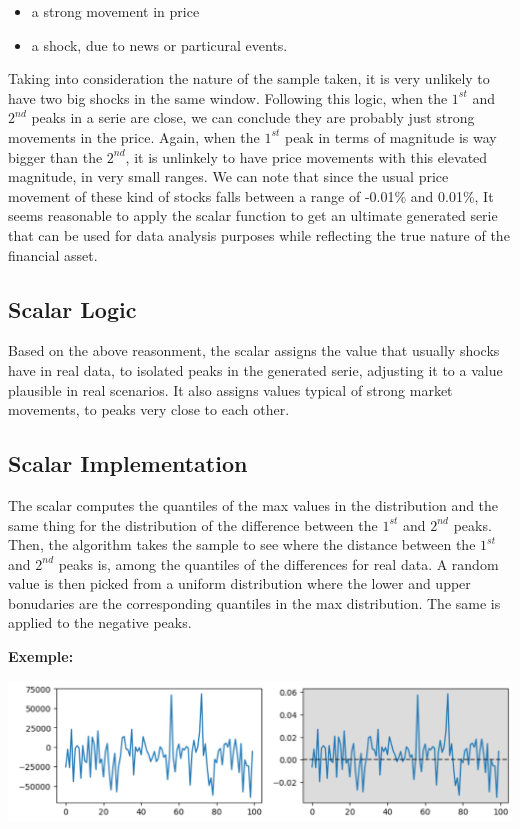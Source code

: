 \documentclass{article}
\begin{document}
\begin{multicols}{2}
    \begin{itemize}
        \item a strong movement in price
        \item a shock, due to news or particural events.
    \end{itemize}  
    Taking into consideration the nature of the sample taken, it is very unlikely to have two big shocks in the same window. Following this logic, when the $1^{st}$ and $2^{nd}$ peaks in a serie are close, we can conclude they are probably just strong movements in the price. Again, when the $1^{st}$ peak in terms of magnitude is way bigger than the $2^{nd}$, it is unlinkely to have price movements with this elevated magnitude, in very small ranges. We can note that since the usual price movement of these kind of stocks falls between a range of -0.01\% and 0.01\%, It seems reasonable to apply the scalar function to get an ultimate generated serie that can be used for data analysis purposes while reflecting the true nature of the financial asset. 
    \subsection*{Scalar Logic}
    Based on the above reasonment, the scalar assigns the value that usually shocks have in real data, to isolated peaks in the generated serie, adjusting it to a value plausible in real scenarios.
    It also assigns values typical of strong market movements, to peaks very close to each other.
    \subsection*{Scalar Implementation}
    The scalar computes the quantiles of the max values in the distribution and the same thing for the distribution of the difference between the $1^{st}$ and 
    $2^{nd}$ peaks.\\
    Then, the algorithm takes the sample to see where the distance between the $1^{st}$ and $2^{nd}$ peaks is, among the quantiles of the differences for real 
    data. A random value is then picked from a uniform distribution where the lower and upper bonudaries are the corresponding quantiles in the max distribution. 
    The same is applied to the negative peaks.
    \end{multicols}
    \textbf{Exemple:}
    \begin{center}
        \includegraphics[scale=0.6]{imgs/EX_03.png}
    \end{center}
\end{document}
